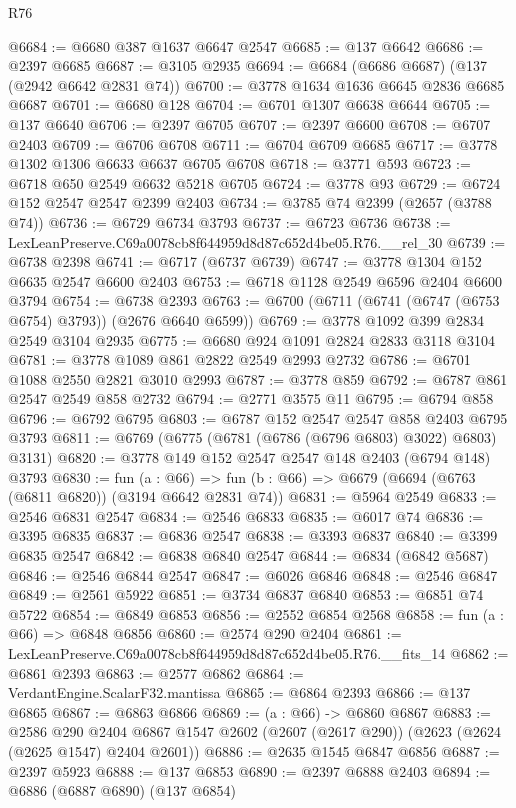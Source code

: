\begin{lexlean}{R76}
\begin{coremodule}
@6684 := @6680 @387 @1637 @6647 @2547
@6685 := @137 @6642
@6686 := @2397 @6685
@6687 := @3105 @2935
@6694 := @6684 (@6686 @6687) (@137 (@2942 @6642 @2831 @74))
@6700 := @3778 @1634 @1636 @6645 @2836 @6685 @6687
@6701 := @6680 @128
@6704 := @6701 @1307 @6638 @6644
@6705 := @137 @6640
@6706 := @2397 @6705
@6707 := @2397 @6600
@6708 := @6707 @2403
@6709 := @6706 @6708
@6711 := @6704 @6709 @6685
@6717 := @3778 @1302 @1306 @6633 @6637 @6705 @6708
@6718 := @3771 @593
@6723 := @6718 @650 @2549 @6632 @5218 @6705
@6724 := @3778 @93
@6729 := @6724 @152 @2547 @2547 @2399 @2403
@6734 := @3785 @74 @2399 (@2657 (@3788 @74))
@6736 := @6729 @6734 @3793
@6737 := @6723 @6736
@6738 := LexLeanPreserve.C69a0078cb8f644959d8d87c652d4be05.R76.__rel_30
@6739 := @6738 @2398
@6741 := @6717 (@6737 @6739)
@6747 := @3778 @1304 @152 @6635 @2547 @6600 @2403
@6753 := @6718 @1128 @2549 @6596 @2404 @6600 @3794
@6754 := @6738 @2393
@6763 := @6700 (@6711 (@6741 (@6747 (@6753 @6754) @3793)) (@2676 @6640 @6599))
@6769 := @3778 @1092 @399 @2834 @2549 @3104 @2935
@6775 := @6680 @924 @1091 @2824 @2833 @3118 @3104
@6781 := @3778 @1089 @861 @2822 @2549 @2993 @2732
@6786 := @6701 @1088 @2550 @2821 @3010 @2993
@6787 := @3778 @859
@6792 := @6787 @861 @2547 @2549 @858 @2732
@6794 := @2771 @3575 @11
@6795 := @6794 @858
@6796 := @6792 @6795
@6803 := @6787 @152 @2547 @2547 @858 @2403 @6795 @3793
@6811 := @6769 (@6775 (@6781 (@6786 (@6796 @6803) @3022) @6803) @3131)
@6820 := @3778 @149 @152 @2547 @2547 @148 @2403 (@6794 @148) @3793
@6830 := fun (a : @66) =>
  fun (b : @66) => @6679 (@6694 (@6763 (@6811 @6820)) (@3194 @6642 @2831 @74))
@6831 := @5964 @2549
@6833 := @2546 @6831 @2547
@6834 := @2546 @6833
@6835 := @6017 @74
@6836 := @3395 @6835
@6837 := @6836 @2547
@6838 := @3393 @6837
@6840 := @3399 @6835 @2547
@6842 := @6838 @6840 @2547
@6844 := @6834 (@6842 @5687)
@6846 := @2546 @6844 @2547
@6847 := @6026 @6846
@6848 := @2546 @6847
@6849 := @2561 @5922
@6851 := @3734 @6837 @6840
@6853 := @6851 @74 @5722
@6854 := @6849 @6853
@6856 := @2552 @6854 @2568
@6858 := fun (a : @66) => @6848 @6856
@6860 := @2574 @290 @2404
@6861 := LexLeanPreserve.C69a0078cb8f644959d8d87c652d4be05.R76.__fits_14
@6862 := @6861 @2393
@6863 := @2577 @6862
@6864 := VerdantEngine.ScalarF32.mantissa
@6865 := @6864 @2393
@6866 := @137 @6865
@6867 := @6863 @6866
@6869 := (a : @66) -> @6860 @6867
@6883 := @2586
    @290
    @2404
    @6867
    @1547
    @2602
    (@2607 (@2617 @290))
    (@2623 (@2624 (@2625 @1547) @2404 @2601))
@6886 := @2635 @1545 @6847 @6856
@6887 := @2397 @5923
@6888 := @137 @6853
@6890 := @2397 @6888 @2403
@6894 := @6886 (@6887 @6890) (@137 @6854)

\end{coremodule}
\end{lexlean}
